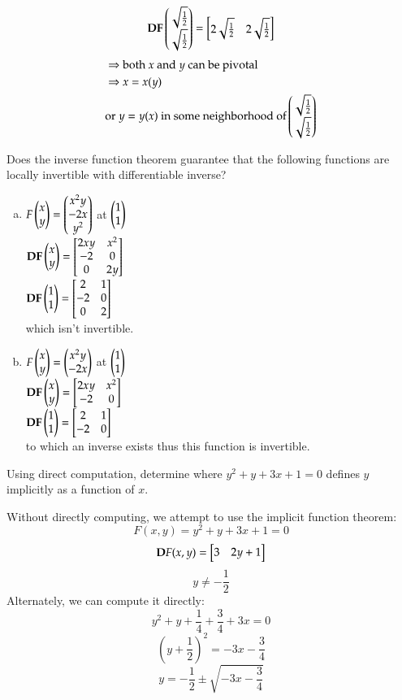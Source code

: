 \[\textbf{DF}\begin{pmatrix} \sqrt{\frac{1}{2}} \\ \sqrt{\frac{1}{2}} \end{pmatrix}=\begin{bmatrix} 2\sqrt{\frac{1}{2}} & 2\sqrt{\frac{1}{2}} \end{bmatrix}\]
\begin{align*}
  &\Rightarrow \text{both $x$ and $y$ can be pivotal} \\
  &\Rightarrow x = x(y) \\
  &\text{or $y = y(x)$ in some neighborhood of} \begin{pmatrix} \sqrt{\frac{1}{2}} \\ \sqrt{\frac{1}{2}} \end{pmatrix}
\end{align*}

Does the inverse function theorem guarantee that the following functions are locally invertible with differentiable inverse?

\begin{enumerate}[a.]
  \item $F\begin{pmatrix} x \\ y \end{pmatrix}=\begin{pmatrix} x^2y \\ -2x \\ y^2 \end{pmatrix}$ at $\begin{pmatrix} 1 \\ 1 \end{pmatrix}$ \\
  $\textbf{DF}\begin{pmatrix} x \\ y \end{pmatrix} = \begin{bmatrix} 2xy & x^2 \\ -2 & 0 \\ 0 & 2y \end{bmatrix}$ \\
  $\textbf{DF}\begin{pmatrix} 1 \\ 1 \end{pmatrix} = \begin{bmatrix} 2 & 1 \\ -2 & 0 \\ 0 & 2 \end{bmatrix}$ \\
  which isn't invertible.
  \item $F\begin{pmatrix} x \\ y \end{pmatrix} = \begin{pmatrix} x^2y \\ -2x \end{pmatrix}$ at $\begin{pmatrix} 1 \\ 1 \end{pmatrix}$ \\
  $\textbf{DF}\begin{pmatrix} x \\ y \end{pmatrix} = \begin{bmatrix} 2xy & x^2 \\ -2 & 0 \end{bmatrix}$ \\
  $\textbf{DF}\begin{pmatrix} 1 \\ 1 \end{pmatrix} = \begin{bmatrix} 2 & 1 \\ -2 & 0 \end{bmatrix}$ \\
  to which an inverse exists thus this function is invertible.
\end{enumerate}

Using direct computation, determine where $y^2 + y +3x + 1 = 0$ defines $y$ implicitly as a function of $x$.

Without directly computing, we attempt to use the implicit function theorem:
\[F(x, y) = y^2 + y +3x + 1 = 0\]
\[\textbf{D}F(x, y) = \begin{bmatrix} 3 & 2y+1 \end{bmatrix}\]
\[y\neq -\frac{1}{2}\]
Alternately, we can compute it directly:
\[y^2 + y + \frac{1}{4} + \frac{3}{4} + 3x = 0\]
\[(y+\frac{1}{2})^2=-3x-\frac{3}{4}\]
\[y = -\frac{1}{2}\pm \sqrt{-3x-\frac{3}{4}}\]
